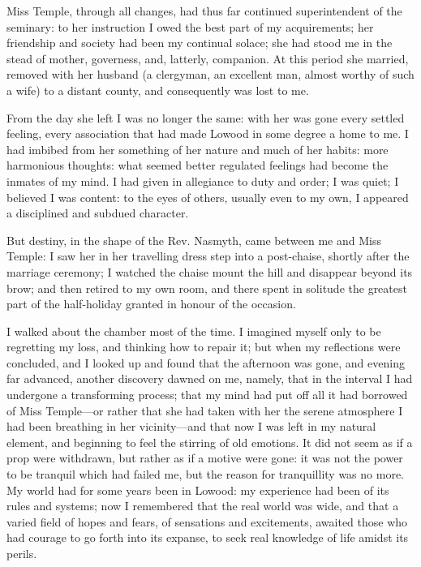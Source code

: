 Miss Temple, through all changes, had thus far continued superintendent
of the seminary: to her instruction I owed the best part of my
acquirements; her friendship and society had been my continual solace;
she had stood me in the stead of mother, governess, and, latterly,
companion. At this period she married, removed with her husband (a
clergyman, an excellent man, almost worthy of such a wife) to a distant
county, and consequently was lost to me.

From the day she left I was no longer the same: with her was gone every
settled feeling, every association that had made Lowood in some degree a
home to me. I had imbibed from her something of her nature and much of
her habits: more harmonious thoughts: what seemed better regulated
feelings had become the inmates of my mind. I had given in allegiance
to duty and order; I was quiet; I believed I was content: to the eyes of
others, usually even to my own, I appeared a disciplined and subdued
character.

But destiny, in the shape of the Rev.\@ \Mr{} Nasmyth, came between me and
Miss Temple: I saw her in her travelling dress step into a post-chaise,
shortly after the marriage ceremony; I watched the chaise mount the hill
and disappear beyond its brow; and then retired to my own room, and
there spent in solitude the greatest part of the half-holiday granted in
honour of the occasion.

I walked about the chamber most of the time. I imagined myself only to
be regretting my loss, and thinking how to repair it; but when my
reflections were concluded, and I looked up and found that the afternoon
was gone, and evening far advanced, another discovery dawned on me,
namely, that in the interval I had undergone a transforming process;
that my mind had put off all it had borrowed of Miss Temple---or rather
that she had taken with her the serene atmosphere I had been breathing
in her vicinity---and that now I was left in my natural element, and
beginning to feel the stirring of old emotions. It did not seem as if a
prop were withdrawn, but rather as if a motive were gone: it was not the
power to be tranquil which had failed me, but the reason for
tranquillity was no more. My world had for some years been in Lowood:
my experience had been of its rules and systems; now I remembered that
the real world was wide, and that a varied field of hopes and fears, of
sensations and excitements, awaited those who had courage to go forth
into its expanse, to seek real knowledge of life amidst its perils.

